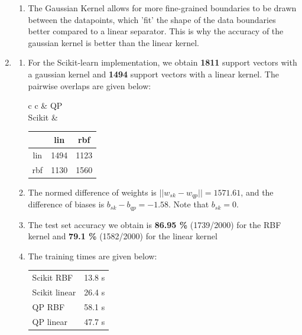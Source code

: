 \documentclass[12pt]{article}
\begin{document}
\begin{enumerate}[label=(\alph*)]
\begin{enumerate}[label=\roman*.]
        \item The Gaussian Kernel allows for more fine-grained boundaries to be drawn between the datapoints, which 'fit' the shape of the data boundaries better compared to a linear separator. This is why the accuracy of the gaussian kernel is better than the linear kernel.
    \end{enumerate}

    \item \begin{enumerate}[label=\roman*.]
        \item For the Scikit-learn implementation, we obtain \textbf{1811} support vectors with a gaussian kernel and \textbf{1494} support vectors with a linear kernel. The pairwise overlaps are given below:
        \begin{center}
            \begin{tabular}{c c}
                & QP \\
                Scikit & 
            \begin{tabular}{c|c|c|}
                    & lin  & rbf  \\   
                \hline
                lin & 1494 & 1123 \\
                \hline
                rbf & 1130 & 1560 \\
                \hline
            \end{tabular}
            \end{tabular}
        \end{center}

    \item The normed difference of weights is $||w_{sk} - w_{qp}|| = 1571.61$, and the difference of biases is $b_{sk} - b_{qp} = -1.58$. Note that $b_{sk} = 0$.

    \item The test set accuracy we obtain is \textbf{86.95 \%} (1739/2000) for the RBF kernel and \textbf{79.1 \%} (1582/2000) for the linear kernel

        \item The training times are given below:
            \begin{center}
                \begin{tabular}{|l|c|}
                    \hline
                    Scikit RBF & 13.8 s \\
                    Scikit linear & 26.4 s\\
                    QP RBF & 58.1 s\\
                    QP linear & 47.7 s\\
                    \hline
                \end{tabular}
            \end{center}
    \end{enumerate}

\end{enumerate}
\end{document}
